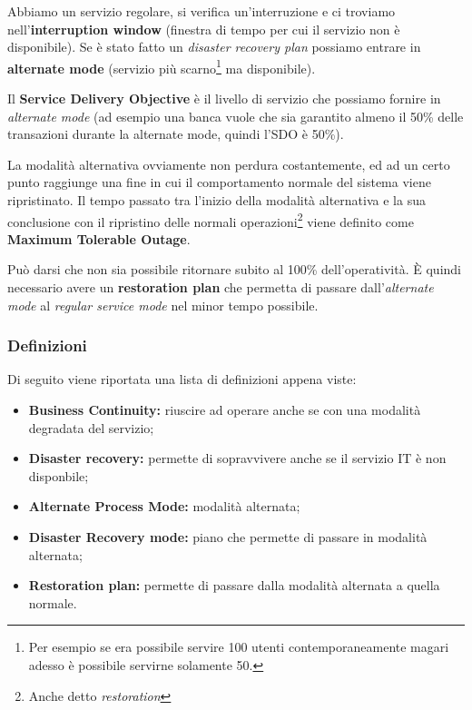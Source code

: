 Abbiamo un servizio regolare, si verifica un'interruzione e ci troviamo
nell'\textbf{interruption window} (finestra di tempo per cui il servizio non è
disponibile). Se è stato fatto un \textit{disaster recovery plan}
possiamo entrare in \textbf{alternate mode} (servizio più scarno\footnote{Per
esempio se era possibile servire 100 utenti contemporaneamente magari adesso
\`e possibile servirne solamente 50.} ma disponibile).

Il \textbf{Service Delivery Objective} è il livello di servizio che possiamo
fornire in \textit{alternate mode} (ad esempio una banca vuole che sia
garantito almeno il 50\% delle transazioni durante la alternate mode, quindi
l'SDO è 50\%).

La modalità alternativa ovviamente non perdura costantemente, ed ad un certo
punto raggiunge una fine in cui il comportamento normale del sistema viene
ripristinato. Il tempo passato tra l'inizio della modalità alternativa e la
sua conclusione con il ripristino delle normali operazioni\footnote{Anche
detto \textit{restoration}} viene definito come \textbf{Maximum Tolerable
Outage}.

Può darsi che non sia possibile ritornare subito al 100\% dell'operatività.
È quindi necessario avere un \textbf{restoration plan} che permetta di passare
dall'\textit{alternate mode} al \textit{regular service mode} nel minor tempo
possibile.

\subsubsection{Definizioni}

Di seguito viene riportata una lista di definizioni appena viste:

\begin{itemize}
 \item \textbf{Business Continuity:} riuscire ad operare anche se con una modalità degradata del servizio;
 \item \textbf{Disaster recovery:} permette di sopravvivere anche se il servizio IT è non disponbile;
 \item \textbf{Alternate Process Mode:} modalità alternata;
 \item \textbf{Disaster Recovery mode:} piano che permette di passare in modalità alternata;
 \item \textbf{Restoration plan:} permette di passare dalla modalità alternata a quella normale.
\end{itemize}

